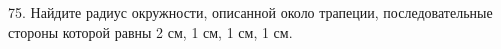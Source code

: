 75. Найдите радиус окружности, описанной около трапеции, последовательные стороны которой равны 2 см, 1 см, 1 см, 1 см.\\

